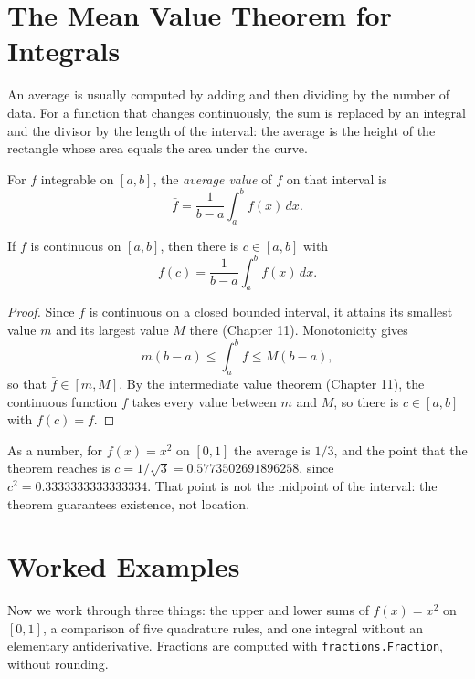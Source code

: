 \section{The Mean Value Theorem for Integrals}

An average is usually computed by adding and then dividing by the number of data. For a function
that changes continuously, the sum is replaced by an integral and the divisor by the length of the interval: the average
is the height of the rectangle whose area equals the area under the curve.

\begin{definisi}
For $f$ integrable on $[a,b]$, the \emph{average value} of $f$ on that interval
is
\[
\bar{f}=\frac{1}{b-a}\int_a^b f(x)\,dx .
\]
\end{definisi}

\begin{teorema}
If $f$ is continuous on $[a,b]$, then there is $c\in[a,b]$ with
\[
f(c)=\frac{1}{b-a}\int_a^b f(x)\,dx .
\]
\end{teorema}

\begin{proof}
Since $f$ is continuous on a closed bounded interval, it attains its smallest value $m$ and
its largest value $M$ there (Chapter 11). Monotonicity gives
\[
m(b-a)\le\int_a^b f\le M(b-a),
\]
so that $\bar{f}\in[m,M]$. By the intermediate value theorem (Chapter 11), the continuous function $f$
takes every value between $m$ and $M$, so there is $c\in[a,b]$ with
$f(c)=\bar{f}$.
\end{proof}

As a number, for $f(x)=x^2$ on $[0,1]$ the average is $1/3$, and the point that the
theorem reaches is $c=1/\sqrt3=0.5773502691896258$, since
$c^2=0.3333333333333334$. That point is not the midpoint of the interval: the theorem guarantees
existence, not location.

\section{Worked Examples}

Now we work through three things: the upper and lower sums of $f(x)=x^2$ on $[0,1]$,
a comparison of five quadrature rules, and one integral without an elementary antiderivative.
Fractions are computed with \texttt{fractions.Fraction}, without rounding.

